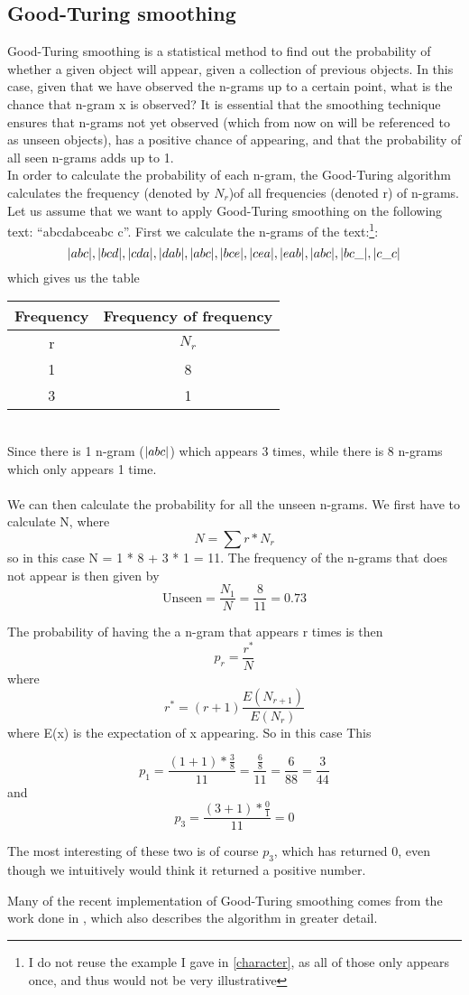 \subsection{Good-Turing smoothing}
\label{Good-Turing}
Good-Turing smoothing is a statistical method to find out the probability of whether a given object will appear, given a collection of previous objects. In this case, given that we have observed the n-grams up to a certain point, what is the chance that n-gram x is observed? It is essential that the smoothing technique ensures that n-grams not yet observed (which from now on will be referenced to as unseen objects), has a positive chance of appearing, and that the probability of all seen n-grams adds up to 1.\\

In order to calculate the probability of each n-gram, the Good-Turing algorithm calculates the frequency (denoted by $N_r$)of all frequencies (denoted r) of n-grams. Let us assume that we want to apply Good-Turing smoothing on the following text: ``abcdabceabc c''. First we calculate the n-grams of the text:\footnote{I do not reuse the example I gave in \ref{character}, as all of those only appears once, and thus would not be very illustrative}:\\
$$
|abc|, |bcd|, |cda|, |dab|, |abc|, |bce|, |cea|, |eab|, |abc|, |bc\_|, |c\_c|
$$
which gives us the table\\
\begin{tabular}{|cc|}
\hline
Frequency & Frequency of frequency \\
\hline
r & $N_{r}$ \\
1 & 8\\
3 & 1\\
\hline
\end{tabular}\\
Since there is 1 n-gram ($|abc|$) which appears 3 times, while there is 8 n-grams which only appears 1 time. 
\\\\
We can then calculate the probability for all the unseen n-grams. We first have to calculate N, where 
$$
N = \sum r * N_r
$$
so in this case N = 1 * 8 + 3 * 1 = 11. The frequency of the n-grams that does not appear is then given by 
$$
\mathrm{Unseen} = \frac{N_1}{N} = \frac{8}{11} = 0.73
$$

The probability of having the a n-gram that appears r times is then 
$$p_r = \frac{r^*}{N}$$
 where 
$$r^* = (r+1)\frac{E(N_{r+1})}{E(N_r)}$$
 where E(x) is the expectation of x appearing. So in this case This 

$$p_1 = \frac{(1 + 1) * \frac{3}{8}}{11} = \frac{\frac{6}{8}}{11} = \frac{6}{88} = \frac{3}{44}$$ and  
$$p_3 = \frac{(3 + 1) * \frac{0}{1}}{11} = 0$$

The most interesting of these two is of course $p_3$, which has returned 0, even though we intuitively would think it returned a positive number.

Many of the recent implementation of Good-Turing smoothing comes from the work done in \cite{Gale94good-turingsmoothing}, which also describes the algorithm in greater detail.
